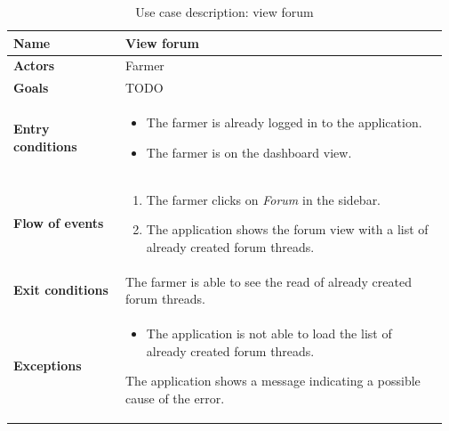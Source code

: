\begin{table}[H]
    \centering
	\begin{tabular}{@{}p{0.25\linewidth} p{0.72\linewidth}@{}}
        \toprule
		\textbf{Name}               & View forum\\
		\midrule
		\textbf{Actors}             & Farmer\\
		\midrule
		\textbf{Goals}              & TODO \\
		\midrule
		
		\textbf{Entry conditions}   & \begin{itemize}[leftmargin=.4cm,noitemsep,topsep=0pt,before=\vspace{-3mm},after=\vspace{-4mm}]
		    \item The farmer is already logged in to the application.
		    \item The farmer is on the dashboard view.
		\end{itemize}\\
		\midrule
		
		\textbf{Flow of events}     & \begin{enumerate}[leftmargin=.4cm,noitemsep,topsep=0pt,before=\vspace{-3mm},after=\vspace{-4mm}]
		    \item The farmer clicks on \textit{Forum} in the sidebar.
		    \item The application shows the forum view with a list of already created forum threads.
		\end{enumerate}\\
		\midrule
		\textbf{Exit conditions}    & The farmer is able to see the read of already created forum threads. \\
		\midrule
		
		\textbf{Exceptions}         & 
	    \begin{itemize}[leftmargin=.4cm,noitemsep,topsep=0pt,before=\vspace{-3mm}]
		   \item The application is not able to load the list of already created forum threads.
		\end{itemize}
		The application shows a message indicating a possible cause of the error.
		\\\bottomrule
	\end{tabular}
	\caption{Use case description: view forum} 
\end{table}

